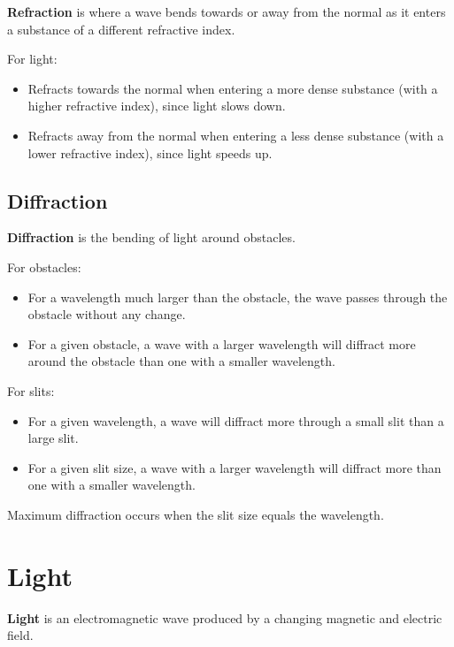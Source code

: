 \documentclass[a4paper,11pt]{report}
\begin{document}

\textbf{Refraction} is where a wave bends towards or away from the normal as it
enters a substance of a different refractive index.

For light:

\begin{itemize}
\item Refracts towards the normal when entering a more dense substance (with
	a higher refractive index), since light slows down.
\item Refracts away from the normal when entering a less dense substance (with
	a lower refractive index), since light speeds up.
\end{itemize}

\subsection{Diffraction}


\textbf{Diffraction} is the bending of light around obstacles.

For obstacles:

\begin{itemize}
\item For a wavelength much larger than the obstacle, the wave passes through
	the obstacle without any change.
\item For a given obstacle, a wave with a larger wavelength will diffract more
	around the obstacle than one with a smaller wavelength.
\end{itemize}

For slits:

\begin{itemize}
\item For a given wavelength, a wave will diffract more through a small slit
	than a large slit.
\item For a given slit size, a wave with a larger wavelength will diffract more
	than one with a smaller wavelength.
\end{itemize}

Maximum diffraction occurs when the slit size equals the wavelength.


\section{Light}

\textbf{Light} is an electromagnetic wave produced by a changing magnetic and
electric field.
\end{document}
